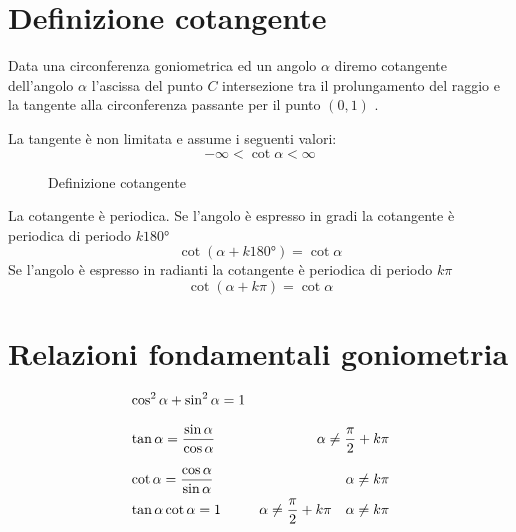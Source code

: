 \section{Definizione cotangente}
\begin{defn}
	Data una circonferenza goniometrica ed un angolo $\alpha$ diremo cotangente dell'angolo $\alpha$ l'ascissa del punto $C$ intersezione tra il prolungamento del raggio e la tangente alla circonferenza passante per il punto $(0,1)$  .
\end{defn}
\begin{prop}\label{prop:cotangentenonlimitata}
	La tangente è non limitata e assume i seguenti valori:
	\begin{equation*}
	-\infty<\cot\alpha< \infty
	\end{equation*}
\end{prop}
\begin{figure}
	\centering
	
	\caption{Definizione cotangente}
	\label{fig:cotangentedefinizione}
\end{figure}
%	
\begin{prop}\label{prop:PeriodoCotangente}
	La cotangente è periodica.
	Se l'angolo è espresso in gradi la cotangente è periodica di periodo $k\ang{180}$
	\begin{equation*}
	\cot(\alpha+k\ang{180;;})=\cot\alpha
	\end{equation*}
	Se l'angolo è espresso in radianti la cotangente è periodica di periodo $k\pi$
	\begin{equation*}
	\cot(\alpha+k\pi)=\cot\alpha
	\end{equation*}
\end{prop}

\section{Relazioni fondamentali goniometria}\label{sec:relazioni-fondamentali-goniometria}
\begin{align*}	
	&\cos^{2}\alpha+\sin^{2}\alpha=1\\[.25cm]\index{Goniometria!relazione!fondamentale}
	&\tan\alpha={}\dfrac{\sin\alpha}{\cos\alpha}&\alpha\neq\dfrac{\pi}{2}+k\pi\\[.25cm]\index{Tangente!definizione}
	&\cot\alpha={}\dfrac{\cos\alpha}{\sin\alpha}&\alpha\neq k\pi\\ \index{Cotangente!definizione}
	&\tan\alpha\cot\alpha={}1&\alpha\neq\dfrac{\pi}{2}+k\pi\quad\alpha\neq k\pi
\end{align*}
